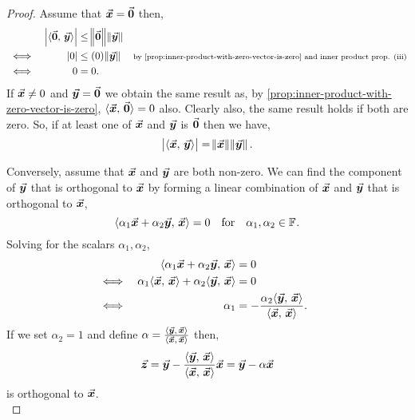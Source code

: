\documentclass[../MathsNotesBase.tex]{subfiles}
\begin{document}
{		
		\biggerskip
		\begin{proof}\nl[2]			
			Assume that ${ \vec{\bm{x}} = \vec{\bm{0}} }$ then,
			\[\begin{aligned}
				&& \left\lvert\langle \vec{\bm{0}},\, \vec{\bm{y}} \rangle\right\rvert &\leq \norm{\vec{\bm{0}}}\norm{\vec{\bm{y}}} \\
				&\iff & \left\lvert0\right\rvert &\leq (0) \norm{\vec{\bm{y}}} &\text{\scriptsize{by \ref{prop:inner-product-with-zero-vector-is-zero} and inner product prop. (iii)}} \\
				&\iff & 0 &= 0.
			\end{aligned}\]
			If ${ \vec{\bm{x}} \neq 0 }$ and ${ \vec{\bm{y}} = \vec{\bm{0}} }$ we obtain the same result as, by \ref{prop:inner-product-with-zero-vector-is-zero}, ${ \langle \vec{\bm{x}},\, \vec{\bm{0}} \rangle = 0 }$ also. Clearly also, the same result holds if both are zero. So, if at least one of $\vec{\bm{x}}$ and $\vec{\bm{y}}$ is $\vec{\bm{0}}$ then we have,
			\[ \left\lvert\langle \vec{\bm{x}},\, \vec{\bm{y}} \rangle\right\rvert = \norm{\vec{\bm{x}}}\norm{\vec{\bm{y}}}. \]
			
			Conversely, assume that $\vec{\bm{x}}$ and $\vec{\bm{y}}$ are both non-zero. We can find the component of $\vec{\bm{y}}$ that is orthogonal to $\vec{\bm{x}}$ by forming a linear combination of $\vec{\bm{x}}$ and $\vec{\bm{y}}$ that is orthogonal to $\vec{\bm{x}}$,
			\[ \langle \alpha_1 \vec{\bm{x}} + \alpha_2 \vec{\bm{y}},\, \vec{\bm{x}} \rangle = 0 \hspace{10pt}\text{for}\hspace{10pt} \alpha_1,\alpha_2 \in \mathbb{F}^{}. \]
			Solving for the scalars ${ \alpha_1, \alpha_2 }$,
			\[\begin{aligned}
				&& \langle \alpha_1 \vec{\bm{x}} + \alpha_2 \vec{\bm{y}},\, \vec{\bm{x}} \rangle &= 0 \\
				&\iff & \alpha_1 \langle \vec{\bm{x}},\, \vec{\bm{x}} \rangle + \alpha_2 \langle \vec{\bm{y}},\, \vec{\bm{x}} \rangle &= 0 &\text{\scriptsize{}} \\
				&\iff & \alpha_1  &= - \frac{ \alpha_2 \langle \vec{\bm{y}},\, \vec{\bm{x}} \rangle }{ \langle \vec{\bm{x}},\, \vec{\bm{x}} \rangle }. \\
			\end{aligned}\]
			If we set ${ \alpha_2 = 1 }$ and define ${ \alpha = \frac{ \langle \vec{\bm{y}},\, \vec{\bm{x}} \rangle }{ \langle \vec{\bm{x}},\, \vec{\bm{x}} \rangle } }$ then,
			\[ \vec{\bm{z}} = \vec{\bm{y}} - \frac{ \langle \vec{\bm{y}},\, \vec{\bm{x}} \rangle }{ \langle \vec{\bm{x}},\, \vec{\bm{x}} \rangle } \vec{\bm{x}} = \vec{\bm{y}} - \alpha \vec{\bm{x}} \]
			is orthogonal to $\vec{\bm{x}}$.\\
			

\end{proof}}
\end{document}
